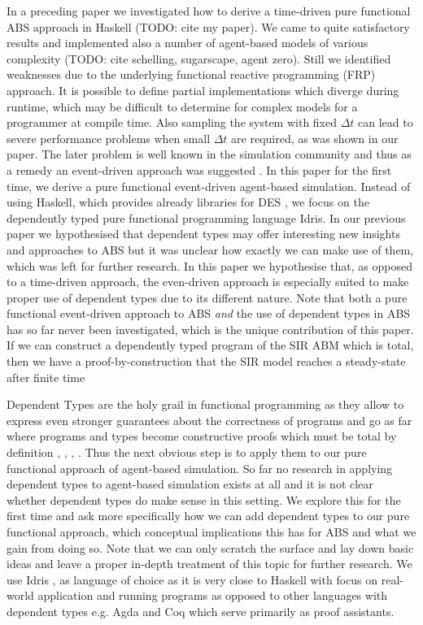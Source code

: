 In a preceding paper we investigated how to derive a time-driven pure functional ABS approach in Haskell (TODO: cite my paper). We came to quite satisfactory results and implemented also a number of agent-based models of various complexity (TODO: cite schelling, sugarscape, agent zero). Still we identified weaknesses due to the underlying functional reactive programming (FRP) approach. It is possible to define partial implementations which diverge during runtime, which may be difficult to determine for complex models for a programmer at compile time. Also sampling the system with fixed $\Delta t$ can lead to severe performance problems when small $\Delta t$ are required, as was shown in our paper. The later problem is well known in the simulation community and thus as a remedy an event-driven approach was suggested \cite{meyer_event-driven_2014}.
In this paper for the first time, we derive a pure functional event-driven agent-based simulation. Instead of using Haskell, which provides already libraries for DES \cite{sorokin_aivika_2015}, we focus on the dependently typed pure functional programming language Idris. In our previous paper we hypothesised that dependent types may offer interesting new insights and approaches to ABS but it was unclear how exactly we can make use of them, which was left for further research. In this paper we hypothesise that, as opposed to a time-driven approach, the even-driven approach is especially suited to make proper use of dependent types due to its different nature. Note that both a pure functional event-driven approach to ABS \textit{and} the use of dependent types in ABS has so far never been investigated, which is the unique contribution of this paper.
If we can construct a dependently typed program of the SIR ABM which is total, then we have a proof-by-construction that the SIR model reaches a steady-state after finite time

Dependent Types are the holy grail in functional programming as they allow to express even stronger guarantees about the correctness of programs and go as far where programs and types become constructive proofs \cite{wadler_propositions_2015} which must be total by definition \cite{thompson_type_1991}, \cite{altenkirch_why_2005}, \cite{altenkirch_pi_sigma:_2010}, \cite{program_homotopy_2013}. Thus the next obvious step is to apply them to our pure functional approach of agent-based simulation. So far no research in applying dependent types to agent-based simulation exists at all and it is not clear whether dependent types do make sense in this setting. We explore this for the first time and ask more specifically how we can add dependent types to our pure functional approach, which conceptual implications this has for ABS and what we gain from doing so. Note that we can only scratch the surface and lay down basic ideas and leave a proper in-depth treatment of this topic for further research. We use Idris \cite{brady_idris_2013}, \cite{brady_type-driven_2017} as language of choice as it is very close to Haskell with focus on real-world application and running programs as opposed to other languages with dependent types e.g. Agda and Coq which serve primarily as proof assistants.

